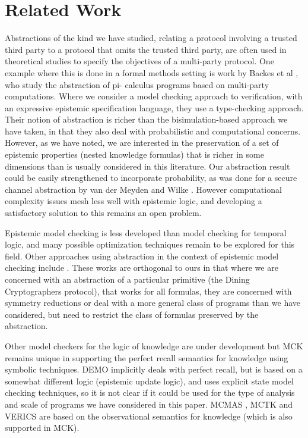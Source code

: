 \documentclass[]{llncs}
\begin{document}
\section{Related Work}\label{sec:related} 

Abstractions of the kind we have studied, relating a  protocol  
involving a trusted third party to a
protocol that omits the trusted third party, are often used in  
theoretical studies to specify the
objectives of a multi-party protocol. One example where this is done  
in a formal methods setting
is work by Backes et al \cite{BMM10}, who study the abstraction of pi- 
calculus programs based on
multi-party computations. Where we consider a model checking approach  
to verification, with an expressive epistemic 
specification language, they use a type-checking approach.  Their  
notion  of abstraction is richer than the bisimulation-based approach  
we have taken,
in that they also deal with probabilistic and computational concerns.
However, as we have noted, we are interested in the preservation of a  
set of epistemic
properties (nested knowledge formulas) that is richer in some  
dimensions than is usually considered in this literature.
Our abstraction result could be easily strengthened to incorporate  
probability, as was done for
a secure channel abstraction by van der Meyden and Wilke  
\cite{MeydenWilke07}.
However computational complexity issues mesh less well with
epistemic logic, and developing a satisfactory solution to this  
remains an open problem.

Epistemic model checking is less developed than model checking for  
temporal logic, and
many possible optimization techniques remain to be explored for this  
field. Other approaches
using abstraction in the context of epistemic model checking include
\cite{CohenDLR09,CohenDLQ09}. These works are orthogonal to ours in that
where we are concerned with an abstraction of a particular primitive  
(the Dining Cryptographers protocol), that works for all formulas,  
they are concerned with symmetry reductions or deal with a more  
general class of programs than we have considered,
but need to restrict the class of formulas preserved by the abstraction.

Other model checkers for the logic of knowledge are under development
but MCK remains unique in supporting the perfect recall semantics for  
knowledge
using symbolic techniques.  DEMO \cite{demo} implicitly deals with  
perfect recall,
but is based on a somewhat different logic (epistemic update logic),  
and uses explicit state model checking techniques,
so it is not clear if it could be used for the type of analysis
and scale of programs we have considered in this paper.
MCMAS \cite{mcmas}, MCTK \cite{mctk} and  VERICS \cite{verics} are  
based on the observational semantics
for knowledge (which is also supported in MCK).
\end{document}
